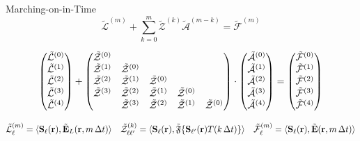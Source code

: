 \documentclass[aspectratio=169]{beamer}
\begin{document}
\begin{frame}
  \begin{block}{Marching-on-in-Time}
    \begin{equation*}
      \tilde{\mathcal{L}}^{(m)} + \sum_{k = 0}^m \tilde{\mathcal{Z}}^{(k)} \tilde{\mathcal{A}}^{(m-k)} = \tilde{\mathcal{F}}^{(m)}
    \end{equation*}
  \end{block}
  \begin{equation*}
    \mqty(\tilde{\mathcal{L}}^{(0)} \\ \tilde{\mathcal{L}}^{(1)} \\ \tilde{\mathcal{L}}^{(2)} \\ \tilde{\mathcal{L}}^{(3)} \\ \tilde{\mathcal{L}}^{(4)}) +
    \mqty(
      \tilde{\mathcal{Z}}^{(0)} \\
      \tilde{\mathcal{Z}}^{(1)} & \tilde{\mathcal{Z}}^{(0)} \\
      \tilde{\mathcal{Z}}^{(2)} & \tilde{\mathcal{Z}}^{(1)} & \tilde{\mathcal{Z}}^{(0)} \\
      \tilde{\mathcal{Z}}^{(3)} & \tilde{\mathcal{Z}}^{(2)} & \tilde{\mathcal{Z}}^{(1)} & \tilde{\mathcal{Z}}^{(0)} \\
                                & \tilde{\mathcal{Z}}^{(3)} & \tilde{\mathcal{Z}}^{(2)} & \tilde{\mathcal{Z}}^{(1)} & \tilde{\mathcal{Z}}^{(0)} \\
    ) \cdot
    \mqty(\tilde{\mathcal{A}}^{(0)} \\ \tilde{\mathcal{A}}^{(1)} \\ \tilde{\mathcal{A}}^{(2)} \\ \tilde{\mathcal{A}}^{(3)} \\ \tilde{\mathcal{A}}^{(4)}) =
    \mqty(\tilde{\mathcal{F}}^{(0)} \\ \tilde{\mathcal{F}}^{(1)} \\ \tilde{\mathcal{F}}^{(2)} \\ \tilde{\mathcal{F}}^{(3)} \\ \tilde{\mathcal{F}}^{(4)})
  \end{equation*}

  \begin{equation*}
    \tilde{\mathcal{L}}^{(m)}_\ell = \langle\vb{S}_\ell(\vb{r}), \tilde{\vb{E}}_L (\vb{r}, m\, \Delta t)\rangle \quad
    \tilde{\mathcal{Z}}^{(k)}_{\ell\ell'} = \langle\vb{S}_\ell(\vb{r}), \tilde{\mathfrak{F}}\qty{\vb{S}_{\ell'}(\vb{r})T(k \, \Delta t)}\rangle \quad
    \tilde{\mathcal{F}}^{(m)}_\ell = \langle\vb{S}_\ell(\vb{r}), \tilde{\vb{E}} (\vb{r}, m\, \Delta t)\rangle
  \end{equation*}
\end{frame}
\end{document}
